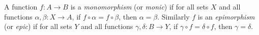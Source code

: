 \begin{definition}
    A function \(f: A \to B\) is a \emph{monomorphism} (or \emph{monic}) if for all sets \(X\) and all functions \(\alpha, \beta: X \to A\), if \(f \circ \alpha = f \circ \beta\), then \(\alpha = \beta\). Similarly \(f\) is an \emph{epimorphism} (or \emph{epic}) if for all sets \(Y\) and all functions \(\gamma, \delta: B \to Y\), if \(\gamma \circ f = \delta \circ f\), then \(\gamma = \delta\).
\end{definition}